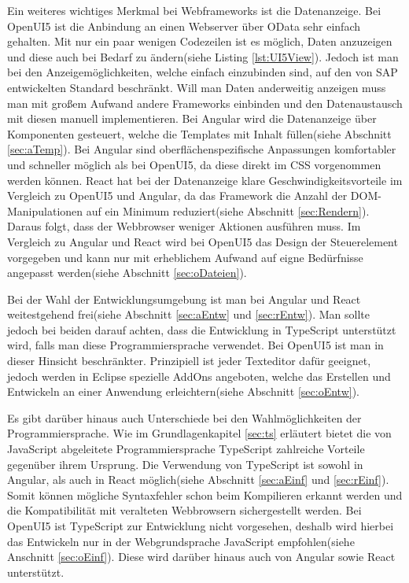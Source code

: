Ein weiteres wichtiges Merkmal bei Webframeworks ist die Datenanzeige. Bei OpenUI5 ist die Anbindung an einen Webserver über OData sehr einfach gehalten. Mit nur ein paar wenigen Codezeilen ist es möglich, Daten anzuzeigen und diese auch bei Bedarf zu ändern(siehe Listing \ref{lst:UI5View}). Jedoch ist man bei den Anzeigemöglichkeiten, welche einfach einzubinden sind, auf den von SAP entwickelten Standard beschränkt. Will man Daten anderweitig anzeigen muss man mit großem Aufwand andere Frameworks einbinden und den Datenaustausch mit diesen manuell implementieren. Bei Angular wird die Datenanzeige über Komponenten gesteuert, welche die Templates mit Inhalt füllen(siehe Abschnitt \ref{sec:aTemp}). Bei Angular sind oberflächenspezifische Anpassungen komfortabler und schneller möglich als bei OpenUI5, da diese direkt im CSS vorgenommen werden können. React hat bei der Datenanzeige klare Geschwindigkeitsvorteile im Vergleich zu OpenUI5 und Angular, da das Framework die Anzahl der DOM-Manipulationen auf ein Minimum reduziert(siehe Abschnitt \ref{sec:Rendern}). Daraus folgt, dass der Webbrowser weniger Aktionen ausführen muss. Im Vergleich zu Angular und React wird bei OpenUI5 das Design der Steuerelement vorgegeben und kann nur mit erheblichem Aufwand auf eigne Bedürfnisse angepasst werden(siehe Abschnitt \ref{sec:oDateien}).  

Bei der Wahl der Entwicklungsumgebung ist man bei Angular und React weitestgehend frei(siehe Abschnitt \ref{sec:aEntw} und \ref{sec:rEntw}). Man sollte jedoch bei beiden darauf achten, dass die Entwicklung in TypeScript unterstützt wird, falls man diese Programmiersprache verwendet. Bei OpenUI5 ist man in dieser Hinsicht beschränkter. Prinzipiell ist jeder Texteditor dafür geeignet, jedoch werden in Eclipse spezielle AddOns angeboten, welche das Erstellen und Entwickeln an einer Anwendung erleichtern(siehe Abschnitt \ref{sec:oEntw}).

Es gibt darüber hinaus auch Unterschiede bei den Wahlmöglichkeiten der Programmiersprache. Wie im Grundlagenkapitel \ref{sec:ts} erläutert bietet die von JavaScript abgeleitete Programmiersprache TypeScript zahlreiche Vorteile gegenüber ihrem Ursprung. Die Verwendung von TypeScript ist sowohl in Angular, als auch in React möglich(siehe Abschnitt \ref{sec:aEinf} und \ref{sec:rEinf}). Somit können mögliche Syntaxfehler schon beim Kompilieren erkannt werden und die Kompatibilität mit veralteten Webbrowsern sichergestellt werden. Bei OpenUI5 ist TypeScript zur Entwicklung nicht vorgesehen, deshalb wird hierbei das Entwickeln nur in der Webgrundsprache JavaScript empfohlen(siehe Anschnitt \ref{sec:oEinf}). Diese wird darüber hinaus auch von Angular sowie React unterstützt.

